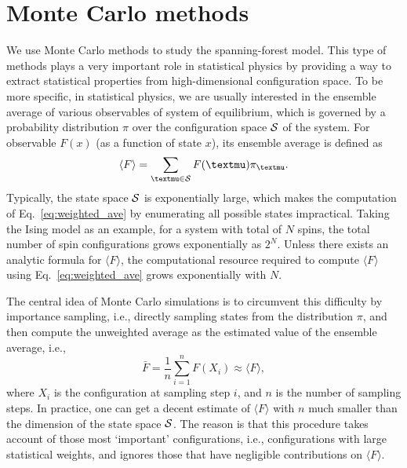 \section{Monte Carlo methods}\label{sec:MC_intro}
We use Monte Carlo methods to study the spanning-forest model. This type of methods plays a very important role in statistical physics by
providing a way to extract statistical properties from high-dimensional configuration space. To be more specific, in statistical
physics, we are usually interested in the ensemble average of various observables of system of equilibrium, which is governed by a probability distribution $\pi$ over the configuration space ${\mathcal S}$ of the system. 
For observable $F(x)$ (as a function of state $x$), its ensemble average is defined as
\begin{equation}\label{eq:weighted_ave}
	\langle F \rangle = \sum_{\mu \in \scrS} F(\mu) \pi_\mu.
\end{equation}
Typically, the state space ${\mathcal S}$ is exponentially large, which makes the computation of Eq.~\eqref{eq:weighted_ave} by enumerating all possible states impractical.
Taking the Ising model as an example, for a system with total of $N$ spins, the total number of spin configurations grows exponentially as $2^N$.
Unless there exists an analytic formula for $\langle F \rangle$, the computational resource required to compute $\langle F \rangle$ 
using Eq.~\eqref{eq:weighted_ave} grows exponentially with $N$.

The central idea of Monte Carlo simulations is to circumvent this difficulty by importance sampling, i.e., directly sampling states from the distribution
$\pi$, and then compute the unweighted average as the estimated value of the ensemble average, i.e.,
\begin{equation}
	\bar{F} = \frac{1}{n}\sum_{i=1}^n F(X_i) \approx \langle F \rangle,
\end{equation}
where $X_i$ is the configuration at sampling step $i$, and $n$ is the number of sampling steps. In practice, one can get a decent estimate of $\langle F \rangle $ with $n$ much smaller
than the dimension of the state space ${\mathcal S}$. The reason is that this procedure takes account of those most `important' configurations,
i.e., configurations with large statistical weights, and ignores those that have negligible contributions on $\langle F \rangle$.

